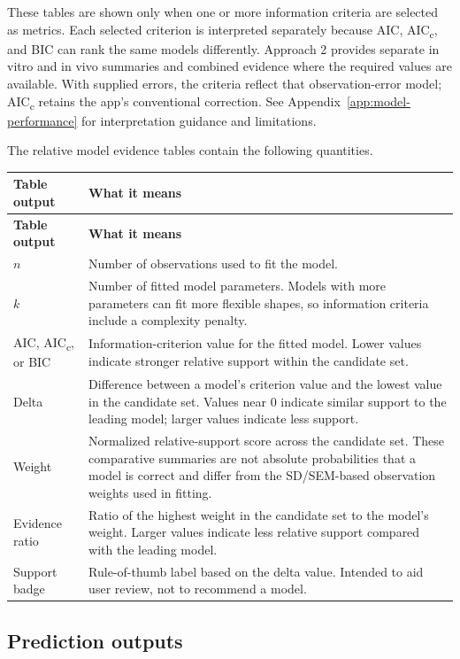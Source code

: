 These tables are shown only when one or more information criteria are selected as metrics. Each selected criterion is interpreted separately because AIC, AIC\textsubscript{c}, and BIC can rank the same models differently. Approach 2 provides separate in vitro and in vivo summaries and combined evidence where the required values are available. With supplied errors, the criteria reflect that observation-error model; AIC\textsubscript{c} retains the app's conventional correction. See Appendix~\ref{app:model-performance} for interpretation guidance and limitations.

The relative model evidence tables contain the following quantities. 

\begin{longtable}{@{}>{\raggedright\arraybackslash}p{}>{\raggedright\arraybackslash}p{}@{}}
\toprule
\textbf{Table output} & \textbf{What it means} \\
\midrule
\endfirsthead
\toprule
\textbf{Table output} & \textbf{What it means} \\
\midrule
\endhead
\(n\) & Number of observations used to fit the model. \\
\(k\) & Number of fitted model parameters. Models with more parameters can fit more flexible shapes, so information criteria include a complexity penalty. \\
AIC, AIC\textsubscript{c}, or BIC & Information-criterion value for the fitted model. Lower values indicate stronger relative support within the candidate set. \\
Delta & Difference between a model's criterion value and the lowest value in the candidate set. Values near 0 indicate similar support to the leading model; larger values indicate less support. \\
Weight & Normalized relative-support score across the candidate set. These comparative summaries are not absolute probabilities that a model is correct and differ from the SD/SEM-based observation weights used in fitting. \\
Evidence ratio & Ratio of the highest weight in the candidate set to the model's weight. Larger values indicate less relative support compared with the leading model. \\
Support badge & Rule-of-thumb label based on the delta value. Intended to aid user review, not to recommend a model. \\
\bottomrule
\end{longtable}


\subsection{Prediction outputs}
\label{sec:prediction-outputs}

